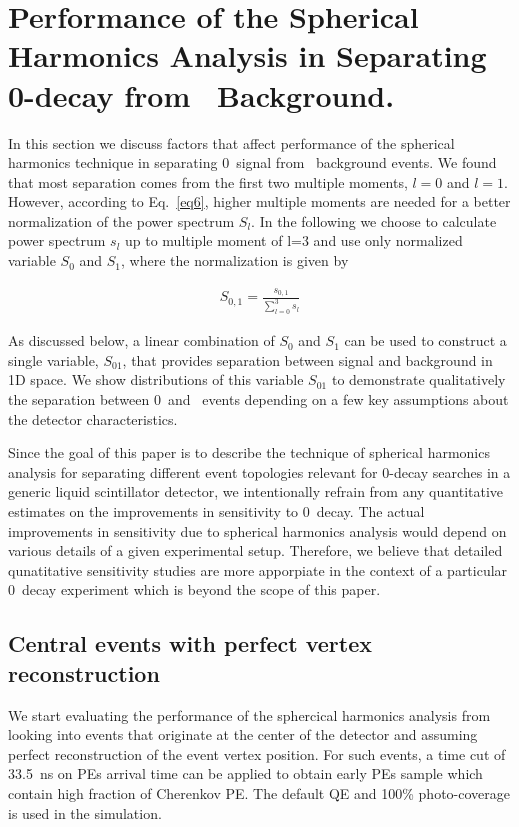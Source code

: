 \section{Performance of the Spherical Harmonics Analysis in Separating 0\nbb-decay from \B~Background.}
\label{sec:performance}

In this section we discuss factors that affect performance of the spherical harmonics technique in separating
0\nbb~signal from \B~background events. We found that most separation comes from the first two multiple moments,
$l=0$ and $l=1$. However, according to Eq.~\ref{eq6}, higher multiple moments are needed for a better normalization of the 
power spectrum $S_l$. In the following we choose to calculate power spectrum $s_l$ up to multiple moment of l=3 and
use only normalized variable $S_0$ and $S_1$, where the normalization is given by

\begin{eqnarray}
\label{eq7}
S_{0,1} = \frac{s_{0,1}}{\sum_{l=0}^{3} s_l}
\end{eqnarray}

As discussed below, a linear combination of $S_0$ and $S_1$ can be used to construct a single variable, $S_{01}$, that provides 
separation between signal and background in 1D space. We show distributions of this variable $S_{01}$ to demonstrate qualitatively 
the separation between 0\nbb~and \B~events depending on a few key assumptions about the detector characteristics.

Since the goal of this paper is to describe the technique of spherical harmonics analysis for separating
different event topologies relevant for 0\nbb-decay searches in a generic liquid scintillator detector, we intentionally refrain from any 
quantitative estimates on the improvements in sensitivity to 0\nbb~decay. The actual improvements in sensitivity due to spherical 
harmonics analysis would depend on various details of a given experimental setup. Therefore, we believe that detailed qunatitative 
sensitivity studies are more apporpiate in the context of a particular 0\nbb~decay experiment which is beyond the scope of this paper.

\subsection{Central events with perfect vertex reconstruction}

We start evaluating the performance of the sphercical harmonics analysis from looking into events that originate at the center
of the detector and assuming perfect reconstruction of the event vertex position. For such events, a time cut of 33.5~ns on PEs 
arrival time can be applied to obtain early PEs sample which contain high fraction of Cherenkov PE. The default QE and 100\% 
photo-coverage is used in the simulation.

